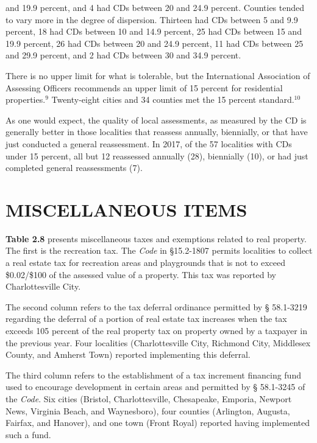 \documentclass[
]{book}
\begin{document}
and 19.9 percent, and 4 had CDs between 20 and 24.9 percent. Counties tended to vary more in the degree of dispersion. Thirteen had CDs between 5 and 9.9 percent, 18 had CDs between 10 and 14.9 percent, 25 had CDs between 15 and 19.9 percent, 26 had CDs between 20 and 24.9 percent, 11 had CDs between 25 and 29.9 percent, and 2 had CDs between 30 and 34.9 percent.

There is no upper limit for what is tolerable, but the International Association of Assessing Officers recommends an upper limit of 15 percent for residential properties.\(^9\) Twenty-eight cities and 34 counties met the 15 percent standard.\(^10\)

As one would expect, the quality of local assessments, as measured by the CD is generally better in those localities that reassess annually, biennially, or that have just conducted a general reassessment. In 2017, of the 57 localities with CDs under 15 percent, all but 12 reassessed annually (28), biennially (10), or had just completed general reassessments (7).

\hypertarget{miscellaneous-items}{%
\section{MISCELLANEOUS ITEMS}\label{miscellaneous-items}}

\textbf{Table 2.8} presents miscellaneous taxes and exemptions related to real property. The first is the recreation tax. The \emph{Code} in §15.2-1807 permits localities to collect a real estate tax for recreation areas and playgrounds that is not to exceed \$0.02/\$100 of the assessed value of a property. This tax was reported by Charlottesville City.

The second column refers to the tax deferral ordinance permitted by § 58.1-3219 regarding the deferral of a portion of real estate tax increases when the tax exceeds 105 percent of the real property tax on property owned by a taxpayer in the previous year. Four localities (Charlottesville City, Richmond City, Middlesex County, and Amherst Town) reported implementing this deferral.

The third column refers to the establishment of a tax increment financing fund used to encourage development in certain areas and permitted by § 58.1-3245 of the \emph{Code}. Six cities (Bristol, Charlottesville, Chesapeake, Emporia, Newport News, Virginia Beach, and Waynesboro), four counties (Arlington, Augusta, Fairfax, and Hanover), and one town (Front Royal) reported having implemented such a fund.
\end{document}
